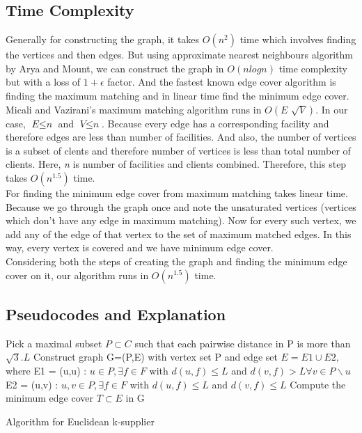\documentclass[12pt, a4paper]{article}
\begin{document}
 \subsection{Time Complexity}
Generally for constructing the graph, it takes $O(n^2)$ time which involves finding the vertices and then edges. But using approximate nearest neighbours algorithm by Arya and Mount, we can construct the graph in $O(nlog{}n)$ time complexity but with a loss of $1+\epsilon$ factor.
And the fastest known edge cover algorithm is finding the maximum matching and in linear time find the minimum edge cover. Micali and Vazirani's maximum matching algorithm runs in $O(\textit{E $\sqrt{V}$})$. In our case, $\textit{E} \leq \textit{n}$ and $\textit{V} \leq \textit{n}$. Because every edge has a corresponding facility and therefore edges are less than number of facilities. And also, the number of vertices is a subset of clents and therefore number of vertices is less than total number of clients. Here, \textit{n} is number of facilities and clients combined. Therefore, this step takes $O(n^{1.5})$ time. \\
For finding the minimum edge cover from maximum matching takes linear time. Because we go through the graph once and note the unsaturated vertices (vertices which don't have any edge in maximum matching). Now for every such vertex, we add any of the edge of that vertex to the set of maximum matched edges. In this way, every vertex is covered and we have minimum edge cover. \\
Considering both the steps of creating the graph and finding the minimum edge cover on it, our algorithm runs in $O(n^{1.5})$ time.



\subsection{Pseudocodes and Explanation}
\begin{algorithm}[H]
 Pick a maximal subset $P \subset C$ such that each pairwise distance in P is more than $\sqrt{3}.L$\;
 Construct graph G=(P,E) with vertex set P and edge set $E = E1 \cup E2$, where \newline
 E1 =  {(u,u) : $ u \in P, \exists f \in F $ with $d(u,f) \leq L$ and $d(v,f) > L \forall v \in P\backslash u$}\;
 E2 =  {(u,v) : $u,v \in P, \exists f \in F$ with $d(u,f) \leq L$ and $d(v,f) \leq L$}\;
 Compute the minimum edge cover $T \subset E$ in G\;
 \caption{Algorithm for Euclidean k-supplier\newline}
 \end{algorithm}
\end{document}
